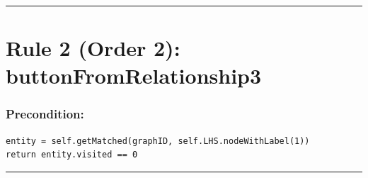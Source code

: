 \documentclass{article}
\begin{document}
\hrule \vspace{6pt}
\section*{  Rule 2 (Order 2): buttonFromRelationship3}

\vspace{8pt}
\subsubsection*{Precondition: }
\begin{small}\begin{verbatim}
entity = self.getMatched(graphID, self.LHS.nodeWithLabel(1))
return entity.visited == 0
\end{verbatim}\end{small}

\hrule \vspace{6pt}
\end{document}
